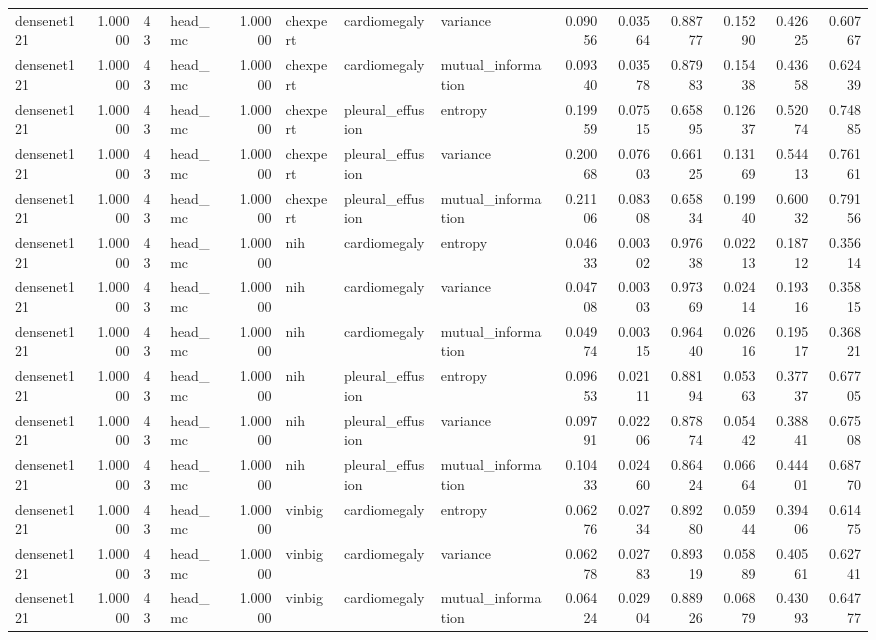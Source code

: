 \begin{tabular}{lrllrlllrrrrrr}
densenet121 & 1.00000 & 43 & head\_mc & 1.00000 & chexpert & cardiomegaly & variance & 0.09056 & 0.03564 & 0.88777 & 0.15290 & 0.42625 & 0.60767 \\
densenet121 & 1.00000 & 43 & head\_mc & 1.00000 & chexpert & cardiomegaly & mutual\_information & 0.09340 & 0.03578 & 0.87983 & 0.15438 & 0.43658 & 0.62439 \\
densenet121 & 1.00000 & 43 & head\_mc & 1.00000 & chexpert & pleural\_effusion & entropy & 0.19959 & 0.07515 & 0.65895 & 0.12637 & 0.52074 & 0.74885 \\
densenet121 & 1.00000 & 43 & head\_mc & 1.00000 & chexpert & pleural\_effusion & variance & 0.20068 & 0.07603 & 0.66125 & 0.13169 & 0.54413 & 0.76161 \\
densenet121 & 1.00000 & 43 & head\_mc & 1.00000 & chexpert & pleural\_effusion & mutual\_information & 0.21106 & 0.08308 & 0.65834 & 0.19940 & 0.60032 & 0.79156 \\
densenet121 & 1.00000 & 43 & head\_mc & 1.00000 & nih & cardiomegaly & entropy & 0.04633 & 0.00302 & 0.97638 & 0.02213 & 0.18712 & 0.35614 \\
densenet121 & 1.00000 & 43 & head\_mc & 1.00000 & nih & cardiomegaly & variance & 0.04708 & 0.00303 & 0.97369 & 0.02414 & 0.19316 & 0.35815 \\
densenet121 & 1.00000 & 43 & head\_mc & 1.00000 & nih & cardiomegaly & mutual\_information & 0.04974 & 0.00315 & 0.96440 & 0.02616 & 0.19517 & 0.36821 \\
densenet121 & 1.00000 & 43 & head\_mc & 1.00000 & nih & pleural\_effusion & entropy & 0.09653 & 0.02111 & 0.88194 & 0.05363 & 0.37737 & 0.67705 \\
densenet121 & 1.00000 & 43 & head\_mc & 1.00000 & nih & pleural\_effusion & variance & 0.09791 & 0.02206 & 0.87874 & 0.05442 & 0.38841 & 0.67508 \\
densenet121 & 1.00000 & 43 & head\_mc & 1.00000 & nih & pleural\_effusion & mutual\_information & 0.10433 & 0.02460 & 0.86424 & 0.06664 & 0.44401 & 0.68770 \\
densenet121 & 1.00000 & 43 & head\_mc & 1.00000 & vinbig & cardiomegaly & entropy & 0.06276 & 0.02734 & 0.89280 & 0.05944 & 0.39406 & 0.61475 \\
densenet121 & 1.00000 & 43 & head\_mc & 1.00000 & vinbig & cardiomegaly & variance & 0.06278 & 0.02783 & 0.89319 & 0.05889 & 0.40561 & 0.62741 \\
densenet121 & 1.00000 & 43 & head\_mc & 1.00000 & vinbig & cardiomegaly & mutual\_information & 0.06424 & 0.02904 & 0.88926 & 0.06879 & 0.43093 & 0.64777 \\

\end{tabular}
